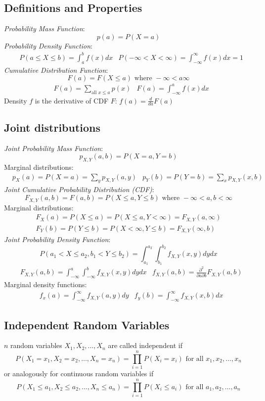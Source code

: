\documentclass[12pt]{article}
\begin{document}
\subsection{Definitions and Properties}
\emph{Probability Mass Function}:
\[
    p(a) = P(X=a)
\]
\emph{Probability Density Function}:
\begin{align*}
    &P(a \leq X \leq b) = \int_{a}^{b} f(x) dx &P(-\infty < X < \infty) = \int_{-\infty}^{\infty} f(x) dx = 1
\end{align*}
\emph{Cumulative Distribution Function}:
\[
    F(a) = F(X \leq a) \text{ where } -\infty < a \infty
\]
\begin{align*}
    &F(a) = \sum_{\text{all } x\leq a} p(x) &F(a) = \int_{-\infty}^a f(x) dx
\end{align*}
Density $f$ is the derivative of CDF $F$: $f(a) = \frac{d}{da} F(a)$

\subsection{Joint distributions}
\emph{Joint Probability Mass Function}:
\[
    p_{X,Y}(a,b) = P(X=a,Y=b)
\]
Marginal distributions:
\begin{align*}
    &p_X(a) = P(X=a)= \sum_y p_{X,Y} (a, y) &p_Y(b) = P(Y=b)= \sum_x p_{X,Y} (x, b)
\end{align*}
\emph{Joint Cumulative Probability Distribution (CDF)}:
\[
    F_{X,Y}(a,b) = F(a,b) = P(X \leq a, Y \leq b) \text{ where } -\infty < a,b < \infty
\]
Marginal distributions:
\begin{align*}
    F_X(a) = P(X \leq a) = P(X \leq a, Y < \infty) = F_{X,Y}(a,\infty) \\
    F_Y(b) = P(Y \leq b) = P(X < \infty, Y \leq b) = F_{X,Y}(\infty, b)
\end{align*}
\emph{Joint Probability Density Function}:
\[
    P(a_1 < X \leq a_2, b_1 < Y \leq b_2) = \int_{a_1}^{a_2} \int_{b_1}^{b_2} f_{X,Y}(x,y) dy dx
\]
\begin{align*}
    &F_{X,Y}(a,b) = \int_{-\infty}^a \int_{-\infty}^b f_{X,Y}(x,y) dy dx &f_{X,Y}(a,b) = \frac{\partial^2}{\partial a \partial b} F_{X,Y} (a,b)
\end{align*}
Marginal density functions:
\begin{align*}
    &f_x(a) = \int_{-\infty}^{\infty} f_{X,Y}(a,y)dy 
    &f_y(b) = \int_{-\infty}^{\infty} f_{X,Y}(x,b)dx
\end{align*}
\subsection{Independent Random Variables}
$n$ random variables $X_1, X_2, \ldots, X_n$ are called independent if
\[
    P(X_1 = x_1, X_2 = x_2, \ldots, X_n = x_n) = \prod_{i=1}^n P(X_i = x_i) \text{ for all } x_1, x_2, \ldots, x_n
\]
or analogously for continuous random variables if
\[
    P(X_1 \leq a_1, X_2 \leq a_2, \ldots, X_n \leq a_n) = \prod_{i=1}^n P(X_i \leq a_i) \text{ for all } a_1, a_2, \ldots, a_n
\]
\end{document}
